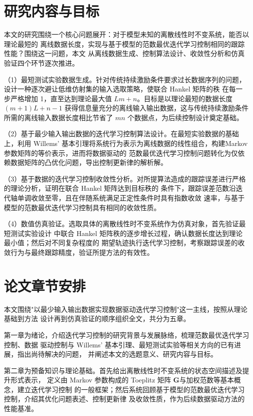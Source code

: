 \section{研究内容与目标}

本文的研究围绕一个核心问题展开：对于模型未知的离散线性时不变系统，能否以理论最短的
离线数据长度，实现与基于模型的范数最优迭代学习控制相同的跟踪性能？围绕这一问题，本文
从离线数据生成、控制算法设计、收敛性分析和仿真验证四个环节逐次推进。

（1）最短测试实验数据生成。针对传统持续激励条件要求过长数据序列的问题，设计一种逐次避让低维仿射集的输入选取策略，使联合 Hankel 矩阵的秩
在每一步严格增加 1，直至达到理论最大值 $L m + n$。目标是以理论最短的数据长度
$(m+1)L + n - 1$ 获得信息量充分的离线输入输出数据，这与传统持续激励条件所需的离线输入数据长度相比节省了 $mn$ 个数据点，为后续控制设计奠定基础。

（2）基于最少输入输出数据的迭代学习控制算法设计。在最短实验数据的基础上，利用 Willems'
基本引理将系统行为表示为离线数据的线性组合，构建Markov参数矩阵的等价表示，进而将数据驱动的
范数最优迭代学习控制问题转化为仅依赖数据矩阵的凸优化问题，导出控制更新律的解析解。

（3）基于数据的迭代学习控制收敛性分析。对所提算法造成的跟踪误差进行严格的理论分析，证明在联合 Hankel 矩阵达到目标秩的
条件下，跟踪误差范数沿迭代轴单调收敛至零，且在伴随系统满足正定性条件时具有指数收敛
速率，与基于模型的范数最优迭代学习控制具有相同的收敛性质。

（4）数值仿真验证。选取具体的离散线性时不变系统作为仿真对象，首先验证最短测试实验设计
中联合 Hankel 矩阵秩的逐步增长过程，确认数据长度达到理论最小值；然后对不同复杂程度的
期望轨迹执行迭代学习控制，考察跟踪误差的收敛行为与最终跟踪精度，验证所提方法的有效性。

\section{论文章节安排}

本文围绕"以最少输入输出数据实现数据驱动迭代学习控制"这一主线，按照从理论基础到方法
设计再到仿真验证的顺序组织全文，共分为五章。

第一章为绪论，介绍迭代学习控制的研究背景与发展脉络，梳理范数最优迭代学习控制、数据
驱动控制与 Willems' 基本引理、最短测试实验等相关方向的已有进展，指出尚待解决的问题，
并阐述本文的选题意义、研究内容与目标。

第二章为预备知识与理论基础。首先给出离散线性时不变系统的状态空间描述及提升形式表示，
定义由 Markov 参数构成的 Toeplitz 矩阵 $\mathbf{G}$与加权范数等基本概念，建立迭代学习控制
的一般框架；然后系统回顾基于模型的范数最优迭代学习控制，介绍其优化问题表述、控制更新律
及收敛性质，作为后续数据驱动方法的性能基准。

